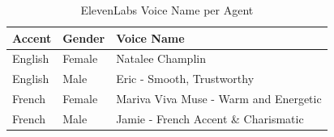 \begin{table}[h]
\centering
\caption{ElevenLabs Voice Name per Agent}
\label{tab:elevenlabs-voices}
\begin{tabular}{lll}
\toprule
\textbf{Accent} & \textbf{Gender} & \textbf{Voice Name} \\
\midrule
English & Female & Natalee Champlin \\
English & Male   & Eric - Smooth, Trustworthy \\
French  & Female & Mariva Viva Muse - Warm and Energetic \\
French  & Male   & Jamie - French Accent \& Charismatic \\
\bottomrule
\end{tabular}
\end{table}